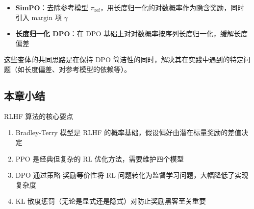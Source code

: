 \begin{itemize}
    \item \textbf{SimPO}：去除参考模型 $\pi_{\text{ref}}$，用长度归一化的对数概率作为隐含奖励，同时引入 margin 项 $\gamma$
    \item \textbf{长度归一化 DPO}：在 DPO 基础上对对数概率按序列长度归一化，缓解长度偏差
\end{itemize}

这些变体的共同思路是在保持 DPO 简洁性的同时，解决其在实践中遇到的特定问题（如长度偏差、对参考模型的依赖等）。

\subsection{本章小结}

\begin{importantbox}{RLHF 算法的核心要点}
\begin{enumerate}
    \item Bradley-Terry 模型是 RLHF 的概率基础，假设偏好由潜在标量奖励的差值决定
    \item PPO 是经典但复杂的 RL 优化方法，需要维护四个模型
    \item DPO 通过策略-奖励等价性将 RL 问题转化为监督学习问题，大幅降低了实现复杂度
    \item KL 散度惩罚（无论是显式还是隐式）对防止奖励黑客至关重要
\end{enumerate}
\end{importantbox}


